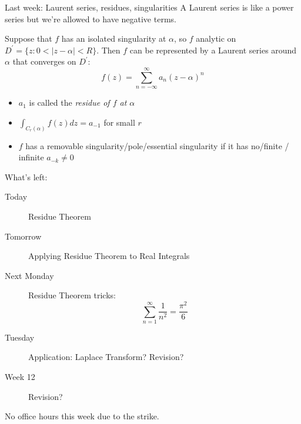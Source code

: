 \documentclass{beamer}
\begin{document}
\begin{frame}{Last week: Laurent series, residues, singularities}
A Laurent series is like a power series but we're allowed to have negative terms.
\begin{theorem} Suppose that $f$ has an isolated singularity at $\alpha$, so $f$ analytic on $D^\prime=\{z: 0< |z-\alpha| < R\}$.  Then $f$ can be represented by a Laurent series around $\alpha$ that converges on $D^\prime$:
$$f(z)=\sum_{n=-\infty}^\infty a_n (z-\alpha)^n$$
\end{theorem}
\begin{itemize}
\item $a_{1}$ is called the \emph{residue of $f$ at $\alpha$}
\item $\int_{C_r(\alpha)}f(z)dz=a_{-1}$ for small $r$
\item $f$ has a removable singularity/pole/essential singularity if it has no/finite / infinite $a_{-k}\neq 0$
\end{itemize}





\end{frame} 

\begin{frame}{What's left:}
\begin{description}
\item[Today] Residue Theorem
\item[Tomorrow] Applying Residue Theorem to Real Integrals
\item[Next Monday] Residue Theorem tricks: $$\sum_{n=1}^\infty \frac{1}{n^2}=\frac{\pi^2}{6}$$
\item[Tuesday] Application: Laplace Transform?  Revision?
\item[Week 12] Revision?
\end{description}

No office hours this week due to the strike.
\end{frame}
\end{document}
